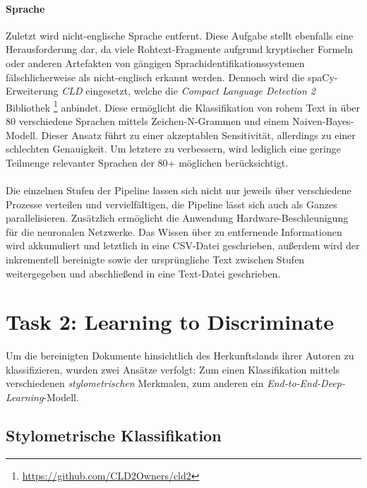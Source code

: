 \documentclass[bachelor,german]{info1thesis}
\begin{document}
\paragraph{Sprache} Zuletzt wird nicht-englische Sprache entfernt. Diese Aufgabe stellt ebenfalls eine Herausforderung dar, da viele Rohtext-Fragmente aufgrund kryptischer Formeln oder anderen Artefakten von gängigen Sprachidentifikationssystemen fälschlicherweise als nicht-englisch erkannt werden. Dennoch wird die spaCy-Erweiterung \textit{CLD} eingesetzt, welche die \textit{Compact Language Detection 2} Bibliothek \footnote{\url{https://github.com/CLD2Owners/cld2}} anbindet. Diese ermöglicht die Klassifikation von rohem  Text in über 80 verschiedene Sprachen mittels Zeichen-N-Grammen und einem Naiven-Bayes-Modell. Dieser Ansatz führt zu einer akzeptablen Sensitivität, allerdings zu einer schlechten Genauigkeit. Um letztere zu verbessern, wird lediglich eine geringe Teilmenge relevanter Sprachen der 80+ möglichen berücksichtigt.
\\
\\
Die einzelnen Stufen der Pipeline lassen sich nicht nur jeweils über verschiedene Prozesse verteilen und vervielfältigen, die Pipeline lässt sich auch als Ganzes parallelisieren. Zusätzlich ermöglicht die Anwendung Hardware-Beschleunigung für die neuronalen Netzwerke. Das Wissen über zu entfernende Informationen wird akkumuliert und letztlich in eine CSV-Datei geschrieben, außerdem wird der inkrementell bereinigte sowie der ursprüngliche Text zwischen Stufen weitergegeben und abschließend in eine Text-Datei geschrieben.

\section{Task 2: Learning to Discriminate}

Um die bereinigten Dokumente hinsichtlich des Herkunftslands ihrer Autoren zu klassifizieren, wurden zwei Ansätze verfolgt: Zum einen Klassifikation mittels verschiedenen \textit{stylometrischen} Merkmalen, zum anderen ein \textit{End-to-End-Deep-Learning}-Modell.

\subsection{Stylometrische Klassifikation}
\end{document}
